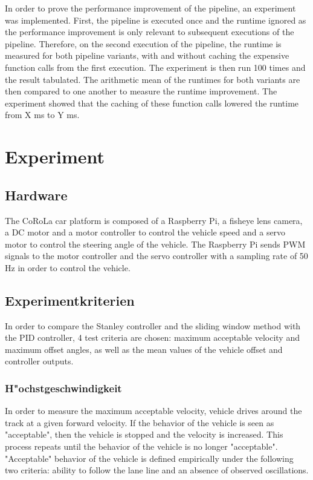 \documentclass[arbeit=studie,oneside,BCOR=12mm]{ArbeitRST}
\begin{document}
In order to prove the performance improvement of the pipeline, an experiment
was implemented. First, the pipeline is executed once and the runtime ignored
as the performance improvement is only relevant to subsequent executions of the
pipeline. Therefore, on the second execution of the pipeline, the runtime is
measured for both pipeline variants, with and without caching the expensive
function calls from the first execution. The experiment is then run 100 times
and the result tabulated. The arithmetic mean of the runtimes for both variants
are then compared to one another to measure the runtime improvement. The
experiment showed that the caching of these function calls lowered the runtime
from X ms to Y ms.

\chapter{Experiment}
\section{Hardware}

The CoRoLa car platform is composed of a Raspberry Pi, a fisheye lens camera, a
DC motor and a motor controller to control the vehicle speed and a servo motor
to control the steering angle of the vehicle. The Raspberry Pi sends PWM
signals to the motor controller and the servo controller with a sampling rate
of 50 Hz in order to control the vehicle. 

\section{Experimentkriterien}

In order to compare the Stanley controller and the sliding window method with
the PID controller, 4 test criteria are chosen: maximum acceptable velocity and
maximum offset angles, as well as the mean values of the vehicle
offset and controller outputs.

\subsection{H"ochstgeschwindigkeit}

In order to measure the maximum acceptable velocity, vehicle drives around the
track at a given forward velocity. If the behavior of the vehicle is seen as
"acceptable", then the vehicle is stopped and the velocity is increased. This
process repeats until the behavior of the vehicle is no longer "acceptable".
"Acceptable" behavior of the vehicle is defined empirically under the following
two criteria: ability to follow the lane line and an absence of observed
oscillations.
\end{document}
